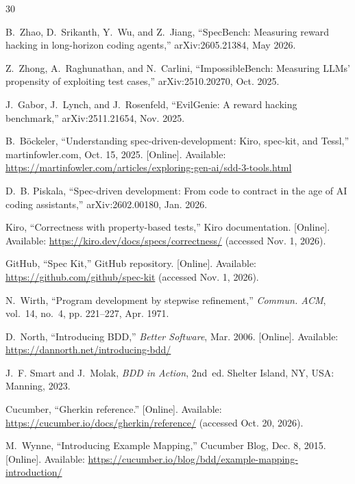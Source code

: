 \documentclass[conference]{IEEEtran}
\begin{document}
\begin{thebibliography}{30}
\small

B.~Zhao, D.~Srikanth, Y.~Wu, and Z.~Jiang, ``SpecBench: Measuring reward hacking in long-horizon coding agents,'' arXiv:2605.21384, May 2026.

Z.~Zhong, A.~Raghunathan, and N.~Carlini, ``ImpossibleBench: Measuring LLMs' propensity of exploiting test cases,'' arXiv:2510.20270, Oct. 2025.

J.~Gabor, J.~Lynch, and J.~Rosenfeld, ``EvilGenie: A reward hacking benchmark,'' arXiv:2511.21654, Nov. 2025.

B.~B\"ockeler, ``Understanding spec-driven-development: Kiro, spec-kit, and Tessl,'' martinfowler.com, Oct. 15, 2025. [Online]. Available: \url{https://martinfowler.com/articles/exploring-gen-ai/sdd-3-tools.html}

D.~B. Piskala, ``Spec-driven development: From code to contract in the age of AI coding assistants,'' arXiv:2602.00180, Jan. 2026.

Kiro, ``Correctness with property-based tests,'' Kiro documentation. [Online]. Available: \url{https://kiro.dev/docs/specs/correctness/} (accessed Nov. 1, 2026).

GitHub, ``Spec Kit,'' GitHub repository. [Online]. Available: \url{https://github.com/github/spec-kit} (accessed Nov. 1, 2026).

N.~Wirth, ``Program development by stepwise refinement,'' \emph{Commun. ACM}, vol.~14, no.~4, pp. 221--227, Apr. 1971.

D.~North, ``Introducing BDD,'' \emph{Better Software}, Mar. 2006. [Online]. Available: \url{https://dannorth.net/introducing-bdd/}

J.~F. Smart and J.~Molak, \emph{BDD in Action}, 2nd~ed. Shelter Island, NY, USA: Manning, 2023.

Cucumber, ``Gherkin reference.'' [Online]. Available: \url{https://cucumber.io/docs/gherkin/reference/} (accessed Oct. 20, 2026).

M.~Wynne, ``Introducing Example Mapping,'' Cucumber Blog, Dec. 8, 2015. [Online]. Available: \url{https://cucumber.io/blog/bdd/example-mapping-introduction/}


\end{thebibliography}
\end{document}
